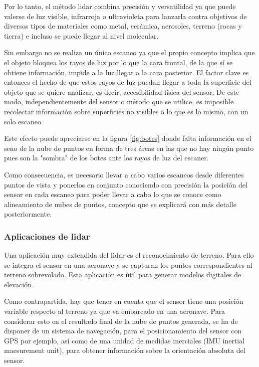 Por lo tanto, el método lidar combina precisión y versatilidad ya que puede valerse de luz visible, infrarroja o ultravioleta para lanzarla contra objetivos de diversos tipos de materiales como metal, cerámica, aerosoles, terreno (rocas y tierra) e incluso se puede llegar al nivel molecular. 
 
Sin embargo no se realiza un único escaneo ya que el propio concepto implica que el objeto bloquea los rayos de luz por lo que la cara frontal, de la que sí se obtiene información, impide a la luz llegar a la cara posterior. El factor clave es entonces el hecho de que estos rayos de luz puedan llegar a toda la superficie del objeto que se quiere analizar, es decir, accesibilidad física del sensor.
De este modo, independientemente del sensor o método que se utilice, es imposible recolectar
información sobre superficies no visibles o lo que es lo mismo, con un solo escaneo.

Este efecto puede apreciarse en la figura \ref{fig:botes} donde falta información en el seno de la nube de puntos en forma de tres áreas en las que no hay ningún punto pues son la "sombra" de los botes ante los rayos de luz del escaner.

Como consecuencia, es necesario llevar a cabo varios escaneos desde diferentes puntos de vista y
ponerlos en conjunto conociendo con precisión la posición del sensor en cada escaneo para poder llevar a cabo lo que se conoce como alineamiento de nubes de puntos, concepto que se explicará con más detalle posteriormente.


\subsubsection{Aplicaciones de lidar}

Una aplicación muy extendida del lidar es el reconocimiento de terreno. Para ello se integra el sensor en una aeronave y se capturan los puntos correspondientes al terreno sobrevolado. Esta aplicación es útil para generar modelos digitales de elevación.

Como contrapartida, hay que tener en cuenta que el sensor tiene una posición variable respecto al terreno ya que va embarcado en una aeronave. Para considerar esto en el resultado final de la nube de puntos generada, se ha de disponer de un sistema de navegación, para el posicionamiento del sensor con GPS por ejemplo, así como de una unidad de medidas inerciales (IMU inertial maesurement unit), para obtener información sobre la orientación absoluta del sensor.

